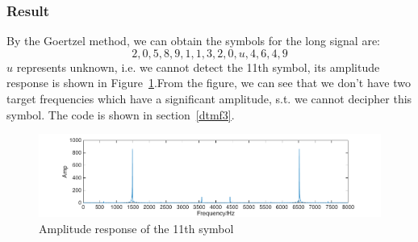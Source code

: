 \subsubsection{Result}
By the Goertzel method, we can obtain the symbols for the long signal are:
$$2,0,5,8,9,1,1,3,2,0,u,4,6,4,9$$
$u$ represents unknown, i.e. we cannot detect the 11th symbol, its amplitude response is shown in Figure~\ref{fig:freq11}.From the figure, we can see that we don't have two target frequencies which have a significant amplitude, s.t. we cannot decipher this symbol. The code is shown in section~\ref{dtmf3}.
\begin{figure}[htp]
	\centering
	\includegraphics[width=16cm]{../fig/freq_11.png}
	\caption{Amplitude response of the 11th symbol}
	\label{fig:freq11}
\end{figure}






